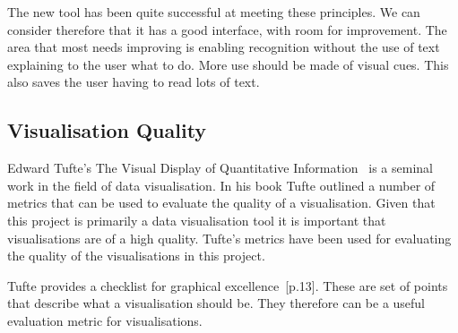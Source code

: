The new tool has been quite successful at meeting these principles.  We can consider therefore that it has a good interface, with room for improvement.  The area that most needs improving is enabling recognition without the use of text explaining to the user what to do.  More use should be made of visual cues.  This also saves the user having to read lots of text.

\subsection{Visualisation Quality}

Edward Tufte's The Visual Display of Quantitative Information~\cite{tufte} is a seminal work in the field of data visualisation.  In his book Tufte outlined a number of metrics that can be used to evaluate the quality of a visualisation.  Given that this project is primarily a data visualisation tool it is important that visualisations are of a high quality.  Tufte's metrics have been used for evaluating the quality of the visualisations in this project.

Tufte provides a checklist for graphical excellence~\cite{tufte}[p.13].  These are set of points that describe what a visualisation should be.  They therefore can be a useful evaluation metric for visualisations.

